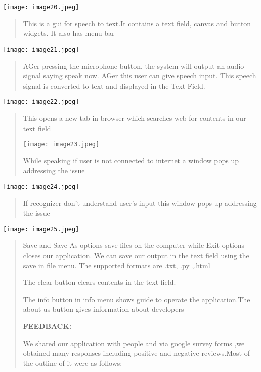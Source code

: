 \documentclass[]{article}
\begin{document}
\texttt{[image: image20.jpeg]}

\begin{quote}
This is a gui for speech to text.It contains a text ﬁeld, canvas and
button widgets. It also has menu bar
\end{quote}

\texttt{[image: image21.jpeg]}

\begin{quote}
AGer pressing the microphone button, the system will output an audio
signal saying speak now. AGer this user can give speech input. This
speech signal is converted to text and displayed in the Text Field.
\end{quote}

\texttt{[image: image22.jpeg]}

\begin{quote}
This opens a new tab in browser which searches web for contents in our
text ﬁeld

\texttt{[image: image23.jpeg]}

While speaking if user is not connected to internet a window pops up
addressing the issue
\end{quote}

\texttt{[image: image24.jpeg]}

\begin{quote}
If recognizer don't understand user's input this window pops up
addressing the issue
\end{quote}

\texttt{[image: image25.jpeg]}

\begin{quote}
Save and Save As options save ﬁles on the computer while Exit options
closes our application. We can save our output in the text ﬁeld using
the save in ﬁle menu. The supported formats are .txt, .py ,.html

The clear button clears contents in the text ﬁeld.

The info button in info menu shows guide to operate the application.The
about us button gives information about developers

\textbf{FEEDBACK:}

We shared our application with people and via google survey forms ,we
obtained many responses including positive and negative reviews.Most of
the outline of it were as follows:
\end{quote}
\end{document}
